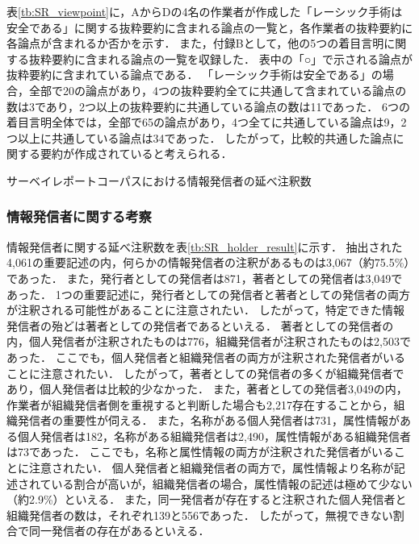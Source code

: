 \documentclass[japanese]{jnlp_1.4}
\begin{document}
{表}\ref{tb:SR_viewpoint}に，AからDの4名の作業者が作成した「レーシック手術は安全である」に関する抜粋要約に含まれる論点の一覧と，各作業者の抜粋要約に各論点が含まれるか否かを示す．
また，付録Bとして，他の5つの着目言明に関する抜粋要約に含まれる論点の一覧を収録した．
表中の「○」で示される論点が抜粋要約に含まれている論点である．
「レーシック手術は安全である」の場合，全部で20の論点があり，4つの抜粋要約全てに共通して含まれている論点の数は3であり，2つ以上の抜粋要約に共通している論点の数は11であった．
6つの着目言明全体では，全部で65の論点があり，4つ全てに共通している論点は9，2つ以上に共通している論点は34であった．
したがって，比較的共通した論点に関する要約が作成されていると考えられる．

\begin{table}[t]
 \caption{サーベイレポートコーパスにおける情報発信者の延べ注釈数}
 \label{tb:SR_holder_result}

\vspace{-1\Cvs}
\end{table}


\subsubsection{情報発信者に関する考察}

{情報}発信者に関する延べ注釈数を表\ref{tb:SR_holder_result}に示す．
抽出された4,061の重要記述の内，何らかの情報発信者の注釈があるものは3,067（約75.5\%）であった．
また，発行者としての発信者は871，著者としての発信者は3,049であった．
1つの重要記述に，発行者としての発信者と著者としての発信者の両方が注釈される可能性があることに注意されたい．
したがって，特定できた情報発信者の殆どは著者としての発信者であるといえる．
著者としての発信者の内，個人発信者が注釈されたものは776，組織発信者が注釈されたものは2,503であった．
ここでも，個人発信者と組織発信者の両方が注釈された発信者がいることに注意されたい．
したがって，著者としての発信者の多くが組織発信者であり，個人発信者は比較的少なかった．
また，著者としての発信者3,049の内，作業者が組織発信者側を重視すると判断した場合も2,217存在することから，組織発信者の重要性が伺える．
また，名称がある個人発信者は731，属性情報がある個人発信者は182，名称がある組織発信者は2,490，属性情報がある組織発信者は73であった．
ここでも，名称と属性情報の両方が注釈された発信者がいることに注意されたい．
個人発信者と組織発信者の両方で，属性情報より名称が記述されている割合が高いが，組織発信者の場合，属性情報の記述は極めて少ない（約2.9\%）といえる．
また，同一発信者が存在すると注釈された個人発信者と組織発信者の数は，それぞれ139と556であった．
したがって，無視できない割合で同一発信者の存在があるといえる．
\end{document}
